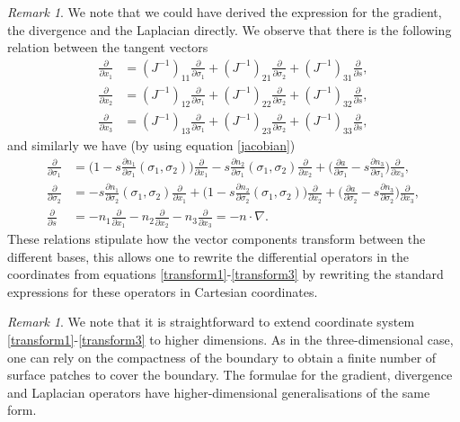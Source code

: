 \documentclass[12pt,a4paper]{article}
\theoremstyle{definition}
\theoremstyle{remark}
\newtheorem{remark}[theorem]{Remark}
\numberwithin{equation}{section}
\begin{document}
\begin{remark}
We note that we could have derived the expression for the gradient, the divergence and the Laplacian directly. We observe that there is the following relation between the tangent vectors
\begin{align*}
\frac{\partial}{\partial x_1} &=  (J^{-1})_{11} \frac{\partial}{\partial \sigma_1} + (J^{-1})_{21} \frac{\partial}{\partial \sigma_2} + (J^{-1})_{31} \frac{\partial}{\partial s}, \\
\frac{\partial}{\partial x_2} &=  (J^{-1})_{12} \frac{\partial}{\partial \sigma_1} + (J^{-1})_{22} \frac{\partial}{\partial \sigma_2} + (J^{-1})_{32} \frac{\partial}{\partial s}, \\
\frac{\partial}{\partial x_3} &=  (J^{-1})_{13} \frac{\partial}{\partial \sigma_1} + (J^{-1})_{23} \frac{\partial}{\partial \sigma_2} + (J^{-1})_{33} \frac{\partial}{\partial s},
\end{align*}
and similarly we have (by using equation \eqref{jacobian})
\begingroup
\allowdisplaybreaks
\begin{align*}
\frac{\partial}{\partial \sigma_1} &= \bigg(1 - s \frac{\partial n_1}{\partial \sigma_1} (\sigma_1, \sigma_2) \bigg) \frac{\partial}{\partial x_1} - s \frac{\partial n_2}{\partial \sigma_1} (\sigma_1, \sigma_2) \frac{\partial}{\partial x_2} + \bigg(\frac{\partial a}{\partial \sigma_1} - s \frac{\partial n_3}{\partial \sigma_1} \bigg) \frac{\partial}{\partial x_3} , \\
\frac{\partial}{\partial \sigma_2} &= - s \frac{\partial n_1}{\partial \sigma_2} (\sigma_1, \sigma_2) \frac{\partial}{\partial x_1} + \bigg(1 - s \frac{\partial n_2}{\partial \sigma_2} (\sigma_1, \sigma_2) \bigg) \frac{\partial}{\partial x_2} + \bigg(\frac{\partial a}{\partial \sigma_2} - s \frac{\partial n_3}{\partial \sigma_2} \bigg) \frac{\partial}{\partial x_3}, \\
\frac{\partial}{\partial s} &= - n_1 \frac{\partial}{\partial x_1} - n_2 \frac{\partial}{\partial x_2} - n_3 \frac{\partial}{\partial x_3} = - n \cdot \nabla.
\end{align*}
\endgroup
These relations stipulate how the vector components transform between the different bases, this allows one to rewrite the differential operators in the coordinates from equations \eqref{transform1}-\eqref{transform3} by rewriting the standard expressions for these operators in Cartesian coordinates. 
\end{remark}
\begin{remark} 
We note that it is straightforward to extend coordinate system \eqref{transform1}-\eqref{transform3} to higher dimensions. As in the three-dimensional case, one can rely on the compactness of the boundary to obtain a finite number of surface patches to cover the boundary. The formulae for the gradient, divergence and Laplacian operators have higher-dimensional generalisations of the same form. 
\end{remark}
\end{document}
